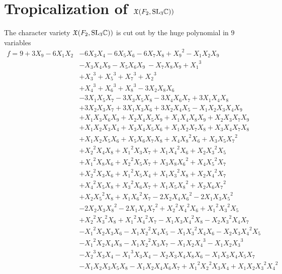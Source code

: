 \documentclass[11pt]{article}
\begin{document}
\section{Tropicalization of  $\mathfrak{X}(F_2, \mathrm{SL}_3\mathbb{C}))$}
The character variety $\mathfrak{X}(F_2, \mathrm{SL}_3\mathbb{C}))$ is cut out by the huge
polynomial in $9$ variables
\[
  \begin{aligned}
    f=9+3X_9 - 6X_1X_2
    &-6X_3X_4-6X_5X_6-6X_7X_8 + {X_9}^2- X_1X_2X_9\\
    & - X_3X_4X_9 - X_5X_6X_9\ - X_7X_8X_9+{X_1}^3\\
    &+ {X_3}^3 + {X_5}^3 + {X_7}^3 + {X_2}^3 \\
    &+ {X_4}^3 + {X_6}^3 + {X_8}^3 - 3X_2X_8X_6\\
    &- 3X_1X_5X_7 - 3X_3X_5X_8-3X_4X_6X_7 + 3X_1X_4X_8\\
    &+ 3X_2X_3X_7 + 3X_1X_3X_6 + 3X_2X_4X_5 - X_1X_2X_3X_4X_9\\
    &+ X_1X_3X_6X_9 + X_2X_4X_5X_9 + X_1X_4X_8X_9+X_2X_3X_7X_9\\
    &+ X_1X_2X_3X_4 + X_3X_4X_5X_6+ X_1X_2X_7X_8 + X_3X_4X_7X_8\\
    &+ X_1X_2X_5X_6+ X_5X_6X_7X_8 + X_4{X_8}^2X_6 + X_3X_5{X_7}^2\\
    &+ {X_2}^2X_4X_8 + {X_1}^2X_3X_7 + X_1{X_4}^2X_6 + X_2{X_3}^2X_5\\
    &+ {X_1}^2X_8X_6 + {X_2}^2X_5X_7+ X_3X_8{X_6}^2 + X_4{X_5}^2X_7 \\
    &+ {X_2}^2X_3X_6 + {X_1}^2X_5X_4 + X_1{X_3}^2X_8 + X_2{X_4}^2X_7\\
    &+ {X_4}^2X_5X_8 + {X_3}^2X_6X_7+ X_1X_5{X_8}^2 + X_2X_6{X_7}^2 \\
    &+ X_2{X_5}^2X_8 + X_1{X_6}^2X_7 - 2X_2X_4{X_6}^2 - 2X_1X_3{X_5}^2\\
    &- 2X_2X_3{X_8}^2 - 2X_1X_4{X_7}^2+ {X_2}^2{X_4}^2X_6 +
    {X_1}^2{X_3}^2X_5\\
    &+ {X_2}^2{X_3}^2X_8 + {X_1}^2{X_4}^2X_7- X_1X_3{X_4}^2X_8 -
    X_2{X_3}^2X_4X_7\\
    &- {X_1}^2X_2X_3X_6 - X_1{X_2}^2X_4X_5- X_1{X_3}^2X_4X_6 -
    X_2X_3{X_4}^2X_5\\
    &- {X_1}^2X_2X_4X_8- X_1{X_2}^2X_3X_7 - X_1X_2{X_4}^3 - X_1X_2{X_3}^3\\
    &- {X_2}^3X_3X_4 - {X_1}^3X_3X_4- X_2X_3X_4X_8X_6 - X_1X_3X_4X_5X_7\\
    & - X_1X_2X_3X_5X_8- X_1X_2X_4X_6X_7 + {X_1}^2{X_2}^2X_3X_4 +
    X_1X_2{X_3}^2{X_4}^2
  \end{aligned}
\]



\end{document}
